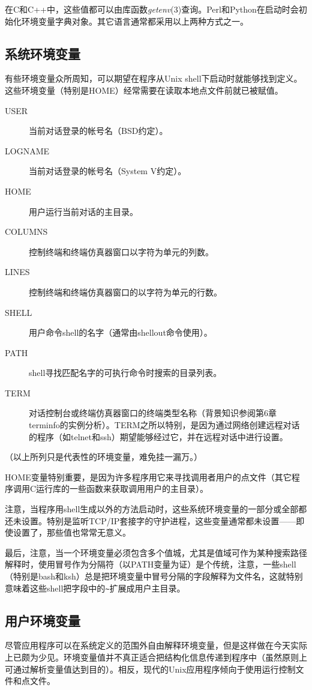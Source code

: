 \documentclass[12pt,oneside]{ctexbook}
\begin{document}
\begin{common-format}
在C和C++中，这些值都可以由库函数\textit{getenv}(3)查询。Perl和Python在启动时会初始化环境变量字典对象。其它语言通常都采用以上两种方式之一。

\subsection{系统环境变量}
有些环境变量众所周知，可以期望在程序从Unix shell下启动时就能够找到定义。这些环境变量（特别是HOME）经常需要在读取本地点文件前就已被赋值。
\begin{description}
\item[USER] 当前对话登录的帐号名（BSD约定）。
\item[LOGNAME] 当前对话登录的帐号名（System V约定）。
\item[HOME] 用户运行当前对话的主目录。
\item[COLUMNS] 控制终端和终端仿真器窗口以字符为单元的列数。
\item[LINES] 控制终端和终端仿真器窗口的以字符为单元的行数。
\item[SHELL] 用户命令shell的名字（通常由shellout命令使用）。
\item[PATH] shell寻找匹配名字的可执行命令时搜索的目录列表。
\item[TERM] 对话控制台或终端仿真器窗口的终端类型名称（背景知识参阅第6章terminfo的实例分析）。TERM之所以特别，是因为通过网络创建远程对话的程序（如telnet和ssh）期望能够经过它，并在远程对话中进行设置。
\end{description}

（以上所列只是代表性的环境变量，难免挂一漏万。）

HOME变量特别重要，是因为许多程序用它来寻找调用者用户的点文件（其它程序调用C运行库的一些函数来获取调用用户的主目录）。

注意，当程序用shell生成以外的方法启动时，这些系统环境变量的一部分或全部都还未设置。特别是监听TCP/IP套接字的守护进程，这些变量通常都未设置——即使设置了，那些值也常常无意义。

最后，注意，当一个环境变量必须包含多个值城，尤其是值域可作为某种搜索路径解释时，使用冒号作为分隔符（以PATH变量为证）是个传统，注意，一些shell（特别是bash和ksh）总是把环境变量中冒号分隔的字段解释为文件名，这就特别意味着这些shell把字段中的\verb+~+扩展成用户主目录。

\subsection{用户环境变量}
尽管应用程序可以在系统定义的范围外自由解释环境变量，但是这样做在今天实际上已颇为少见。环境变量值并不真正适合把结构化信息传递到程序中（虽然原则上可通过解析变量值达到目的）。相反，现代的Unix应用程序倾向于使用运行控制文件和点文件。


\end{common-format}
\end{document}
